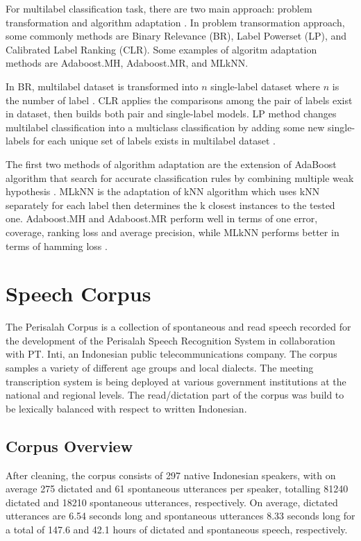 \documentclass[conference]{IEEEtran}
\begin{document}
For multilabel classification task, there are two main approach: problem transformation and algorithm adaptation \cite{tsoumakas}.
In problem transormation approach, some commonly methods are Binary Relevance (BR), Label Powerset (LP), and Calibrated Label Ranking (CLR).
Some examples of algoritm adaptation methods are Adaboost.MH, Adaboost.MR, and MLkNN.

In BR, multilabel dataset is transformed into $n$ single-label dataset where $n$ is the number of label \cite{prajapati}.
CLR applies the comparisons among the pair of labels exist in dataset, then builds both pair and single-label models.
LP method changes multilabel classification into a multiclass classification \cite{demb} by adding some new single-labels for each unique set of labels exists in multilabel dataset \cite{prajapati}.

The first two methods of algorithm adaptation are the extension of AdaBoost algorithm that search for accurate classification rules by combining multiple weak hypothesis \cite{dharmadhikari}.
MLkNN is the adaptation of kNN algorithm which uses kNN separately for each label then determines the k closest instances to the tested one.
Adaboost.MH and Adaboost.MR perform well in terms of one error, coverage, ranking loss and average precision, while MLkNN performs better in terms of hamming loss \cite{zhang}.

\section{Speech Corpus}

The Perisalah Corpus is a collection of spontaneous and read speech recorded for the development of the Perisalah Speech Recognition System \cite{} in collaboration with PT. Inti, an Indonesian public telecommunications company.
The corpus samples a variety of different age groups and local dialects.
The meeting transcription system is being deployed at various government institutions at the national and regional levels.
The read/dictation part of the corpus was build to be lexically balanced with respect to written Indonesian.

\subsection{Corpus Overview}

After cleaning, the corpus consists of 297 native Indonesian speakers, with on average 275 dictated and 61 spontaneous utterances per speaker, totalling 81240 dictated and 18210 spontaneous utterances, respectively.
On average, dictated utterances are 6.54 seconds long and spontaneous utterances 8.33 seconds long for a total of 147.6 and 42.1 hours of dictated and spontaneous speech, respectively.
\end{document}
